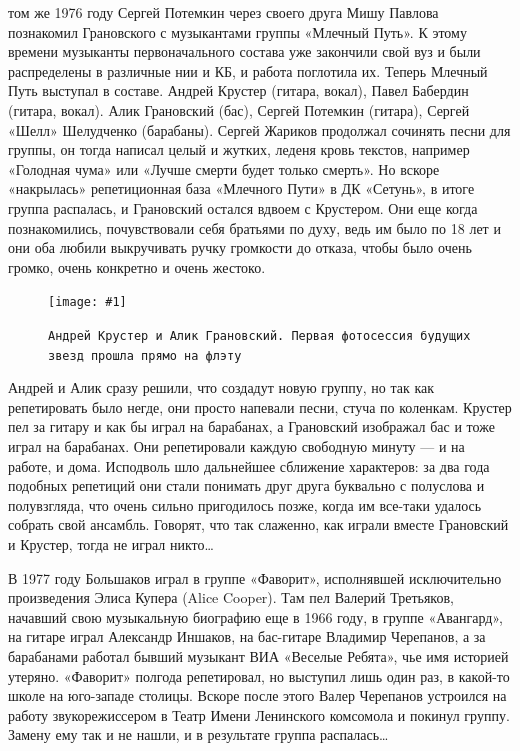 \documentclass[10pt, twoside]{book}
\newcommand{\myincludegraphics}[1]{\texttt{[image: \#1]}}
\begin{document}
 том же 1976 году Сергей Потемкин через своего друга Мишу Павлова познакомил Грановского с музыкантами группы
«Млечный Путь». К этому времени музыканты первоначального состава уже закончили свой вуз и были распределены в различные
нии и КБ, и работа поглотила их. Теперь Млечный Путь выступал в составе. Андрей Крустер (гитара, вокал), Павел Бабердин
(гитара, вокал). Алик Грановский (бас), Сергей Потемкин (гитара), Сергей «Шелл» Шелудченко (барабаны). Сергей Жариков
продолжал сочинять песни для группы, он тогда написал целый и жутких, леденя кровь текстов, например «Голодная чума» или
«Лучше смерти будет только смерть». Но вскоре «накрылась» репетиционная база «Млечного Пути» в ДК «Сетунь», в итоге
группа распалась, и Грановский остался вдвоем с Крустером. Они еще когда познакомились, почувствовали себя братьями по
духу, ведь им было по 18 лет и они оба любили выкручивать ручку громкости до отказа, чтобы было очень громко, очень
конкретно и очень жестоко.

\begin{figure}[h]
    \centering
    \myincludegraphics{Image05}
    \caption{\texttt{Андрей Крустер и Алик Грановский. Первая фотосессия будущих звезд прошла прямо на флэту}}
\end{figure}

Андрей и Алик сразу решили, что создадут новую группу, но так как репетировать было негде, они просто напевали песни,
стуча по коленкам. Крустер пел за гитару и как бы играл на барабанах, а Грановский изображал бас и тоже играл на
барабанах. Они репетировали каждую свободную минуту — и на работе, и дома. Исподволь шло дальнейшее сближение
характеров: за два года подобных репетиций они стали понимать друг друга буквально с полуслова и полувзгляда, что очень
сильно пригодилось позже, когда им все-таки удалось собрать свой ансамбль. Говорят, что так слаженно, как играли вместе
Грановский и Крустер, тогда не играл никто\ldots

В 1977 году Большаков играл в группе «Фаворит», исполнявшей исключительно произведения Элиса Купера (Alice Cooper). Там
пел Валерий Третьяков, начавший свою музыкальную биографию еще в 1966 году, в группе «Авангард», на гитаре играл
Александр Иншаков, на бас-гитаре Владимир Черепанов, а за барабанами работал бывший музыкант ВИА «Веселые Ребята», чье
имя историей утеряно. «Фаворит» полгода репетировал, но выступил лишь один раз, в какой-то школе на юго-западе столицы.
Вскоре после этого Валер Черепанов устроился на работу звукорежиссером в Театр Имени Ленинского комсомола и покинул
группу. Замену ему так и не нашли, и в результате группа распалась\ldots
\end{document}

